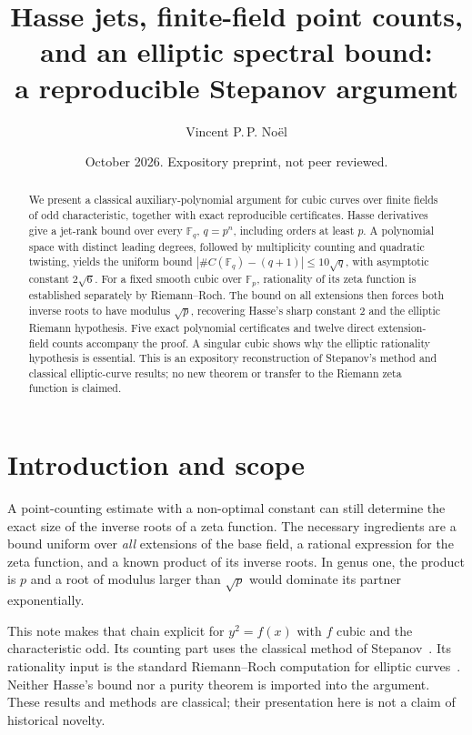 \documentclass[11pt]{amsart}
\title[Hasse jets and an elliptic spectral bound]{Hasse jets, finite-field point counts, and an elliptic spectral bound:\\
a reproducible Stepanov argument}
\author{Vincent P.\,P. No\"el}
\date{October 2026. Expository preprint, not peer reviewed.}
\theoremstyle{definition}
\theoremstyle{remark}
\newcommand{\F}{\mathbb F}
\begin{document}
\begin{abstract}
We present a classical auxiliary-polynomial argument for cubic curves over finite fields of odd characteristic, together with exact reproducible certificates. Hasse derivatives give a jet-rank bound over every $\F_q$, $q=p^n$, including orders at least $p$. A polynomial space with distinct leading degrees, followed by multiplicity counting and quadratic twisting, yields the uniform bound $|\#C(\F_q)-(q+1)|\le10\sqrt q$, with asymptotic constant $2\sqrt6$. For a fixed smooth cubic over $\F_p$, rationality of its zeta function is established separately by Riemann--Roch. The bound on all extensions then forces both inverse roots to have modulus $\sqrt p$, recovering Hasse's sharp constant $2$ and the elliptic Riemann hypothesis. Five exact polynomial certificates and twelve direct extension-field counts accompany the proof. A singular cubic shows why the elliptic rationality hypothesis is essential. This is an expository reconstruction of Stepanov's method and classical elliptic-curve results; no new theorem or transfer to the Riemann zeta function is claimed.
\end{abstract}

\maketitle

\section{Introduction and scope}\label{sec:intro}

A point-counting estimate with a non-optimal constant can still determine the exact size of the inverse roots of a zeta function. The necessary ingredients are a bound uniform over \emph{all} extensions of the base field, a rational expression for the zeta function, and a known product of its inverse roots. In genus one, the product is $p$ and a root of modulus larger than $\sqrt p$ would dominate its partner exponentially.

This note makes that chain explicit for $y^2=f(x)$ with $f$ cubic and the characteristic odd. Its counting part uses the classical method of Stepanov~\cite{Ste69,Bom74}. Its rationality input is the standard Riemann--Roch computation for elliptic curves~\cite[I, \S4; IV, \S9]{Mil20}. Neither Hasse's bound nor a purity theorem is imported into the argument. These results and methods are classical; their presentation here is not a claim of historical novelty.
\end{document}
